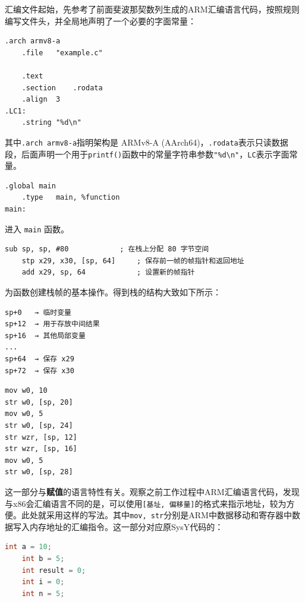 \documentclass[UTF8,a4paper,10pt]{ctexart}
\begin{document}
\vspace{1em}

汇编文件起始，先参考了前面斐波那契数列生成的ARM汇编语言代码，按照规则编写文件头，并全局地声明了一个必要的字面常量：
\begin{lstlisting}[frame=trbl,language={[x86masm]Assembler}]
	.arch armv8-a
	.file	"example.c"
    
	.text
	.section	.rodata
	.align	3
.LC1:
	.string	"%d\n"
\end{lstlisting}

其中\texttt{.arch armv8-a}指明架构是 ARMv8-A (AArch64)，\texttt{.rodata}表示只读数据段，后面声明一个用于\texttt{printf()}函数中的常量字符串参数\texttt{"\%d\textbackslash n"}，\texttt{LC}表示字面常量。

\begin{lstlisting}[frame=trbl,language={[x86masm]Assembler}]
	.global	main
	.type	main, %function
main:
\end{lstlisting}

进入 \texttt{main} 函数。

\begin{lstlisting}[frame=trbl,language={[x86masm]Assembler}]
	sub	sp, sp, #80            ; 在栈上分配 80 字节空间
	stp	x29, x30, [sp, 64]     ; 保存前一帧的帧指针和返回地址
	add	x29, sp, 64            ; 设置新的帧指针
\end{lstlisting}

为函数创建栈帧的基本操作。得到栈的结构大致如下所示：

\begin{lstlisting}[frame=trbl]
sp+0   → 临时变量
sp+12  → 用于存放中间结果
sp+16  → 其他局部变量
...
sp+64  → 保存 x29
sp+72  → 保存 x30
\end{lstlisting}

\vspace{1em}

\begin{lstlisting}[frame=trbl,language={[x86masm]Assembler}]
mov	w0, 10
str	w0, [sp, 20]
mov	w0, 5
str	w0, [sp, 24]
str	wzr, [sp, 12]
str	wzr, [sp, 16]
mov	w0, 5
str	w0, [sp, 28]
\end{lstlisting}

这一部分与\textbf{赋值}的语言特性有关。观察之前工作过程中ARM汇编语言代码，发现与x86会汇编语言不同的是，可以使用\texttt{[基址, 偏移量]}的格式来指示地址，较为方便。此处就采用这样的写法。其中\texttt{mov, str}分别是ARM中数据移动和寄存器中数据写入内存地址的汇编指令。这一部分对应原SysY代码的：

\begin{lstlisting}[frame=trbl,language={C}]
    int a = 10;     
    int b = 5;
    int result = 0;
    int i = 0;
    int n = 5;
\end{lstlisting}
\end{document}
